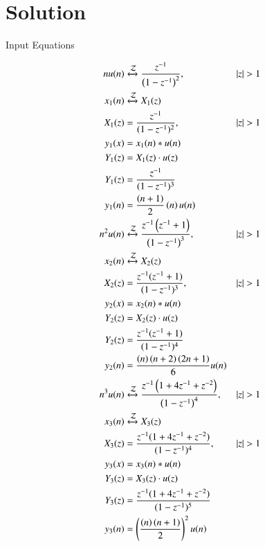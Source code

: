 \documentclass[journal,12pt,onecolumn]{IEEEtran}
\theoremstyle{remark}
\begin{document}
\section*{Solution}
\begin{table}[h]
  \centering
  
  \caption{Input Equations}
  \label{tab:input-equations}
\end{table}
\begin{align}
    n u(n) &\xleftrightarrow{\mathcal{Z}} \frac{z^{-1}}{\left(1-z^{-1}\right)^2}, & \left\vert z\right\vert > 1 \\
    x_1(n) &\xleftrightarrow{\mathcal{Z}}X_1(z)\\
    X_1(z) &= \frac{z^{-1}}{(1-z^{-1})^2}, &|z| > 1 \\
    y_1(x) &= x_1(n)* u(n)\\
    Y_1(z) &= X_1(z) \cdot u(z) \\
    Y_1(z) &= \frac{z^{-1}}{(1-z^{-1})^3} \\
    y_1(n) &= \frac{\left( n+1 \right)}{2}\left( n \right)u(n)\\
    n^2 u(n) &\xleftrightarrow{\mathcal{Z}} \frac{z^{-1}\left(z^{-1}+1\right)}{\left(1-z^{-1}\right)^3}, & \left\vert z\right\vert > 1\\
    x_2(n) &\xleftrightarrow{\mathcal{Z}}X_2(z)\\
    X_2(z) &= \frac{z^{-1}(z^{-1}+1)}{(1-z^{-1})^3}, &|z| > 1 \\
    y_2(x) &= x_2(n)* u(n)\\
    Y_2(z) &= X_2(z) \cdot u(z) \\
    Y_2(z) &= \frac{z^{-1}(z^{-1}+1)}{(1-z^{-1})^4} \\ 
    y_2(n) &= \frac{\left( n \right)\left( n+2 \right)\left( 2n+1 \right)}{6}u(n) \\
    n^3 u(n) &\xleftrightarrow{\mathcal{Z}} \frac{z^{-1}\left(1+4z^{-1}+z^{-2}\right)}{\left(1-z^{-1}\right)^4}, & \left\vert z\right\vert >1 \\ 
    x_3(n) &\xleftrightarrow{\mathcal{Z}}X_3(z)\\
    X_3(z) &= \frac{z^{-1}(1+4z^{-1}+z^{-2})}{(1-z^{-1})^4}, &|z| > 1 \\
    y_3(x) &= x_3(n)* u(n)\\
    Y_3(z) &= X_3(z) \cdot u(z) \\
    Y_3(z) &= \frac{z^{-1}(1+4z^{-1}+z^{-2})}{(1-z^{-1})^5}\\
    y_3(n) &= \left(\frac{\left( n \right)\left( n+1 \right)}{2}\right)^2u(n)
\end{align}
\end{document}
